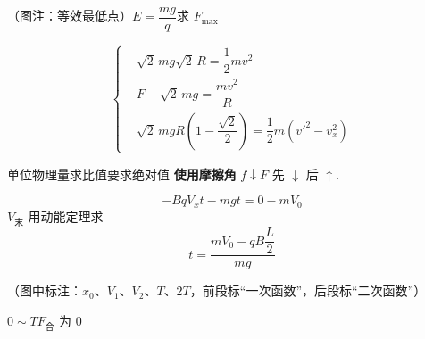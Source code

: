 \begin{problem}
（图注：等效最低点）\quad $E=\dfrac{mg}{q}$\qquad 求 $F_{\max}$
\begin{solution}
\[
\left\{\begin{aligned}
&\sqrt2\,mg\sqrt2\,R=\dfrac12mv^2\\
&F-\sqrt2\,mg=\dfrac{mv^2}{R}\\
&\sqrt2\,mgR\left(1-\dfrac{\sqrt2}{2}\right)=\dfrac12m\left(v'^2-v_x^2\right)
\end{aligned}\right.
\]
\end{solution}
\end{problem}
单位\unclear{$\ne$}物理量\qquad 求比值要求绝对值
\textbf{使用摩擦角}
$f\downarrow$\quad $F$ 先 $\downarrow$ 后 $\uparrow$.
\begin{problem}
\begin{solution}
\[ -BqV_xt-mgt=0-mV_0 \]
$V_{\text{末}}$ 用动能定理求
\[ t=\dfrac{mV_0-qB\dfrac{L}{2}}{mg} \]
\end{solution}
\end{problem}
（图中标注：$x_0$、$V_1$、$V_2$、$T$、$2T$，前段标“一次函数”，后段标“二次函数”）

$0\sim T$\quad $F_{\text{合}}$ 为 $0$

